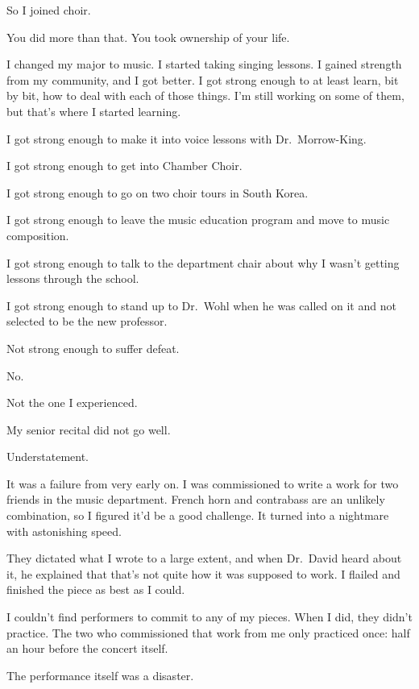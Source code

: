 \begin{paracol}{2}
\begin{leftcolumn}
So I joined choir.

\begin{ally}
You did more than that. You took ownership of your life.
\end{ally}
I changed my major to music. I started taking singing lessons. I gained strength from my community, and I got better. I got strong enough to at least learn, bit by bit, how to deal with each of those things. I'm still working on some of them, but that's where I started learning.

I got strong enough to make it into voice lessons with Dr.~Morrow-King.

I got strong enough to get into Chamber Choir.

I got strong enough to go on two choir tours in South Korea.

I got strong enough to leave the music education program and move to music composition.

I got strong enough to talk to the department chair about why I wasn't getting lessons through the school.

I got strong enough to stand up to Dr.~Wohl when he was called on it and not selected to be the new professor.

\begin{ally}
Not strong enough to suffer defeat.
\end{ally}
No.

Not the one I experienced.
\newpage

\noindent My senior recital did not go well.

\begin{ally}
Understatement.
\end{ally}
It was a failure from very early on. I was commissioned to write a work for two friends in the music department. French horn and contrabass are an unlikely combination, so I figured it'd be a good challenge. It turned into a nightmare with astonishing speed.

They dictated what I wrote to a large extent, and when Dr.~David heard about it, he explained that that's not quite how it was supposed to work. I flailed and finished the piece as best as I could.

I couldn't find performers to commit to any of my pieces. When I did, they didn't practice. The two who commissioned that work from me only practiced once: half an hour before the concert itself.

The performance itself was a disaster.


\end{leftcolumn}
\end{paracol}
